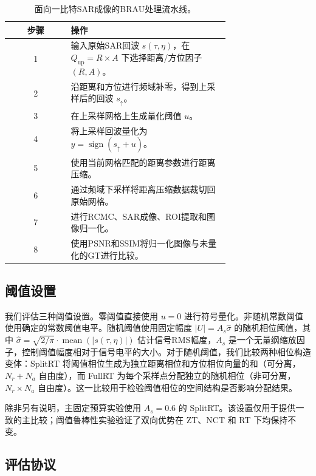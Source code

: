 \documentclass[conference]{IEEEtran}
\begin{document}
\begin{table}[t]
\caption{面向一比特SAR成像的BRAU处理流水线。}
\label{alg:brau}
\begin{center}
\scriptsize
\setlength{\tabcolsep}{3pt}
\begin{tabular}{c p{0.72\linewidth}}
\hline
步骤 & 操作 \\
\hline
1 & 输入原始SAR回波 $s(\tau,\eta)$，在 $Q_{\mathrm{up}}=R\times A$ 下选择距离/方位因子 $(R,A)$。 \\
2 & 沿距离和方位进行频域补零，得到上采样后的回波 $s_{\uparrow}$。 \\
3 & 在上采样网格上生成量化阈值 $u$。 \\
4 & 将上采样回波量化为 $y=\operatorname{sign}(s_{\uparrow}+u)$。 \\
5 & 使用当前网格匹配的距离参数进行距离压缩。 \\
6 & 通过频域下采样将距离压缩数据裁切回原始网格。 \\
7 & 进行RCMC、SAR成像、ROI提取和图像归一化。 \\
8 & 使用PSNR和SSIM将归一化图像与未量化的GT进行比较。 \\
\hline
\end{tabular}
\end{center}
\end{table}

\subsection{阈值设置}

我们评估三种阈值设置。零阈值直接使用 $u=0$ 进行符号量化。非随机常数阈值使用确定的常数阈值电平。随机阈值使用固定幅度 $|U|=A_s\hat{\sigma}$ 的随机相位阈值，其中 $\hat{\sigma}= \sqrt{2/\pi}\cdot\operatorname{mean}(|s(\tau,\eta)|)$ 估计信号RMS幅度，$A_s$ 是一个无量纲缩放因子，控制阈值幅度相对于信号电平的大小。对于随机阈值，我们比较两种相位构造变体：SplitRT 将阈值相位生成为独立距离相位和方位相位向量的和（可分离，$N_r+N_a$ 自由度），而 FullRT 为每个采样点分配独立的随机相位（非可分离，$N_r\times N_a$ 自由度）。这一比较用于检验阈值相位的空间结构是否影响分配结果。

除非另有说明，主固定预算实验使用 $A_s=0.6$ 的 SplitRT。该设置仅用于提供一致的主比较；阈值鲁棒性实验验证了双向优势在 ZT、NCT 和 RT 下均保持不变。

\subsection{评估协议}
\end{document}
